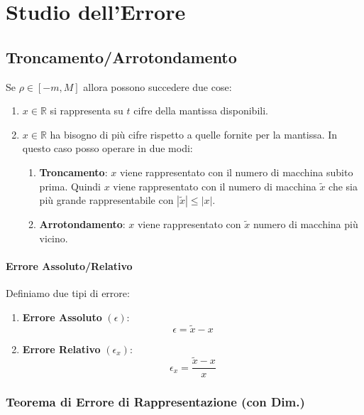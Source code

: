 \documentclass{article}
\begin{document}
\newpage

\section{Studio dell'Errore}

\subsection{Troncamento/Arrotondamento}

Se $\rho \in [-m,M]$ allora possono succedere due cose:

\begin{enumerate}
    \item $x \in \mathbb{R}$ si rappresenta su $t$ cifre della mantissa disponibili.
    \item $x \in \mathbb{R}$ ha bisogno di più cifre rispetto a quelle fornite per la mantissa. In questo caso posso operare in due modi:
    \begin{enumerate}
        \item \textbf{Troncamento}: $x$ viene rappresentato con il numero di macchina subito prima. Quindi $x$ viene rappresentato con il numero di macchina $\tilde{x}$ che sia più grande rappresentabile con $|\tilde{x} |\leq |x|$.
        \item \textbf{Arrotondamento}: $x$ viene rappresentato con $\tilde{x}$ numero di macchina più vicino.
    \end{enumerate}
\end{enumerate}

\paragraph{Errore Assoluto/Relativo}

Definiamo due tipi di errore:

\begin{enumerate}
    \item \textbf{Errore Assoluto} $(\epsilon)$:
    \[ \epsilon = \tilde{x} - x \]
    \item \textbf{Errore Relativo} $(\epsilon_{x})$:
    \[ \epsilon_{x} = \frac{\tilde{x} - x}{x} \]
    
\end{enumerate}

\subsubsection{Teorema di Errore di Rappresentazione (con Dim.)}
\end{document}
